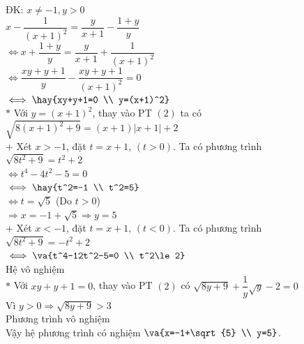 \lgi 
ĐK: $x\neq -1,y>0$\\
$x-\dfrac{1}{(x+1)^2}=\dfrac{y}{x+1}-\dfrac{1+y}{y}$\\
$\iff x+\dfrac{1+y}{y}=\dfrac{y}{x+1}+\dfrac{1}{(x+1)^2}$\\
$\iff \dfrac{xy+y+1}{y}-\dfrac{xy+y+1}{(x+1)^2}=0$\\
$\iff \hay{xy+y+1=0 \\ y=(x+1)^2}$\\
$*$ Với $y=(x+1)^2$, thay vào PT $(2)$ ta có $\sqrt{8(x+1)^2+9}=(x+1)|x+1|+2$\\
+ Xét $x>-1$, đặt $t=x+1$, $(t>0)$. Ta có phương trình\\
$\sqrt{8t^2+9}=t^2+2$\\
$\iff t^4-4t^2-5=0$\\
$\iff \hay{t^2=-1 \\ t^2=5}$\\
$\iff t=\sqrt{5}$ (Do $t>0$)\\
$\Rightarrow x=-1+\sqrt{5}\Rightarrow y=5$\\
+ Xét $x<-1$, đặt $t=x+1$, $(t<0)$. Ta có phương trình\\
$\sqrt{8t^2+9}=-t^2+2$\\
$\iff \va{t^4-12t^2-5=0 \\ t^2\le 2}$\\
Hệ vô nghiệm\\
$*$ Với $xy+y+1=0$, thay vào PT $(2)$ có $\sqrt{8y+9}+\dfrac{1}{y}\sqrt{y}-2=0$\\
Vì $y>0\Rightarrow \sqrt{8y+9}>3$\\
Phương trình vô nghiệm\\
Vậy hệ phương trình có nghiệm $\va{x=-1+\sqrt{5} \\ y=5}$.

